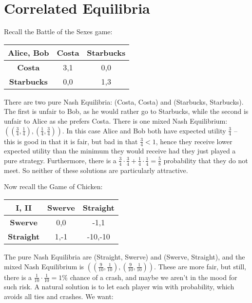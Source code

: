 \section{Correlated Equilibria}

Recall the Battle of the Sexes game:

\begin{center}
	\begin{tabular}{|c|c|c|}
		\hline
		\textbf{Alice, Bob} & \textbf{Costa} & \textbf{Starbucks} \\ \hline
		\textbf{Costa}      & 3,1            & 0,0 \\ \hline
		\textbf{Starbucks}  & 0,0            & 1,3 \\ \hline
	\end{tabular}
\end{center}

There are two pure Nash Equilibria: (Costa, Costa) and (Starbucks, Starbucks).
The first is unfair to Bob, as he would rather go to Starbucks, while the
second is unfair to Alice as she prefers Costa. There is one mixed Nash
Equilibrium: $((\frac{3}{4}, \frac{1}{4}), (\frac{1}{4}, \frac{3}{4}))$. In
this case Alice and Bob both have expected utility $\frac{3}{4}$ -- this is
good in that it is fair, but bad in that $\frac{3}{4} < 1$, hence they receive
lower expected utility than the minimum they would receive had they just played
a pure strategy. Furthermore, there is a $\frac{3}{4} \cdot \frac{3}{4} +
\frac{1}{4} \cdot \frac{1}{4} = \frac{5}{8}$ probability that they do not meet.
So neither of these solutions are particularly attractive.

Now recall the Game of Chicken:

\begin{center}
	\begin{tabular}{|c|c|c|}
		\hline
		\textbf{I, II}    & \textbf{Swerve} & \textbf{Straight} \\ \hline
		\textbf{Swerve}   & 0,0             & -1,1 \\ \hline
		\textbf{Straight} & 1,-1            & -10,-10 \\ \hline
	\end{tabular}
\end{center}

The pure Nash Equilibria are (Straight, Swerve) and (Swerve, Straight), and the
mixed Nash Equilibrium is $((\frac{9}{10}, \frac{1}{10}), (\frac{9}{10},
\frac{1}{10}))$. These are more fair, but still, there is a $\frac{1}{10} \cdot
\frac{1}{10} = 1\%$ chance of a crash, and maybe we aren't in the mood for such
risk. A natural solution is to let each player win with probability, which
avoids all ties and crashes. We want:


